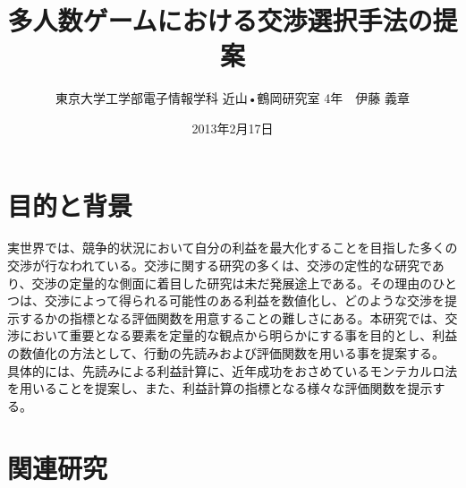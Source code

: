\documentclass[a4, 10pt,dvipdfmx,twocolumn]{jsarticle}
\title{多人数ゲームにおける交渉選択手法の提案}
\author{東京大学工学部電子情報学科 近山•鶴岡研究室 4年　伊藤 義章}
\date{2013年2月17日}
\begin{document}



\newpage
\maketitle


\section{目的と背景}

実世界では、競争的状況において自分の利益を最大化することを目指した多くの交渉が行なわれている。交渉に関する研究の多くは、交渉の定性的な研究であり、交渉の定量的な側面に着目した研究は未だ発展途上である。その理由のひとつは、交渉によって得られる可能性のある利益を数値化し、どのような交渉を提示するかの指標となる評価関数を用意することの難しさにある。本研究では、交渉において重要となる要素を定量的な観点から明らかにする事を目的とし、利益の数値化の方法として、行動の先読みおよび評価関数を用いる事を提案する。
具体的には、先読みによる利益計算に、近年成功をおさめているモンテカルロ法を用いることを提案し、また、利益計算の指標となる様々な評価関数を提示する。

\section{関連研究}
\end{document}
